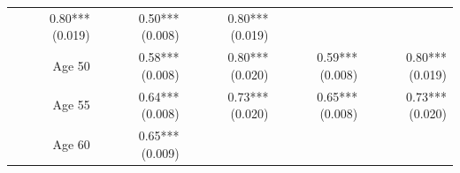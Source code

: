 \documentclass[]{article}
\begin{document}
\begin{longtable}[c]{@{}rrrrr@{}}
\begin{minipage}[t]{0.16\columnwidth}
0.80*** (0.019)
\strut\end{minipage} &
\begin{minipage}[t]{0.21\columnwidth}\raggedleft\strut
0.50*** (0.008)
\strut\end{minipage} &
\begin{minipage}[t]{0.15\columnwidth}\raggedleft\strut
0.80*** (0.019)
\strut\end{minipage}\tabularnewline
\begin{minipage}[t]{0.17\columnwidth}\raggedleft\strut
Age 50
\strut\end{minipage} &
\begin{minipage}[t]{0.18\columnwidth}\raggedleft\strut
0.58*** (0.008)
\strut\end{minipage} &
\begin{minipage}[t]{0.16\columnwidth}\raggedleft\strut
0.80*** (0.020)
\strut\end{minipage} &
\begin{minipage}[t]{0.21\columnwidth}\raggedleft\strut
0.59*** (0.008)
\strut\end{minipage} &
\begin{minipage}[t]{0.15\columnwidth}\raggedleft\strut
0.80*** (0.019)
\strut\end{minipage}\tabularnewline
\begin{minipage}[t]{0.17\columnwidth}\raggedleft\strut
Age 55
\strut\end{minipage} &
\begin{minipage}[t]{0.18\columnwidth}\raggedleft\strut
0.64*** (0.008)
\strut\end{minipage} &
\begin{minipage}[t]{0.16\columnwidth}\raggedleft\strut
0.73*** (0.020)
\strut\end{minipage} &
\begin{minipage}[t]{0.21\columnwidth}\raggedleft\strut
0.65*** (0.008)
\strut\end{minipage} &
\begin{minipage}[t]{0.15\columnwidth}\raggedleft\strut
0.73*** (0.020)
\strut\end{minipage}\tabularnewline
\begin{minipage}[t]{0.17\columnwidth}\raggedleft\strut
Age 60
\strut\end{minipage} &
\begin{minipage}[t]{0.18\columnwidth}\raggedleft\strut
0.65*** (0.009)
\strut\end{minipage} &
\begin{minipage}[t]{0.16\columnwidth}\raggedleft\strut

\end{minipage}
\end{longtable}
\end{document}
